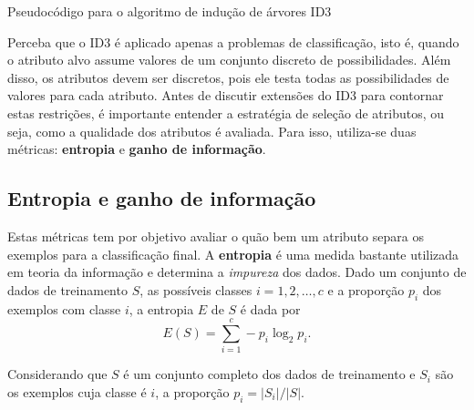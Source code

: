 \begin{algorithm}[h]
	\DontPrintSemicolon
	
	
	\caption{Pseudocódigo para o algoritmo de indução de árvores ID3}
	\label{alg:id3}
\end{algorithm}

Perceba que o ID3 é aplicado apenas a problemas de classificação, isto é, quando o atributo alvo assume valores de um conjunto discreto de possibilidades. Além disso, os atributos devem ser discretos, pois ele testa todas as possibilidades de valores para cada atributo. Antes de discutir extensões do ID3 para contornar estas restrições, é importante entender a estratégia de seleção de atributos, ou seja, como a qualidade dos atributos é avaliada. Para isso, utiliza-se duas métricas: \textbf{entropia} e \textbf{ganho de informação}.

\subsection{Entropia e ganho de informação}

Estas métricas tem por objetivo avaliar o quão bem um atributo separa os exemplos para a classificação final. A \textbf{entropia} é uma medida bastante utilizada em teoria da informação e determina a \textit{impureza} dos dados. Dado um conjunto de dados de treinamento $S$, as possíveis classes $i = 1, 2, \hdots, c$ e a proporção $p_i$ dos exemplos com classe $i$, a entropia $E$ de $S$ é dada por
$$
E(S) = \sum_{i=1}^{c} -p_i \log_2 p_i.
$$

Considerando que $S$ é um conjunto completo dos dados de treinamento e $S_i$ são os exemplos cuja classe é $i$, a proporção $p_i = |S_i| / |S|$.

